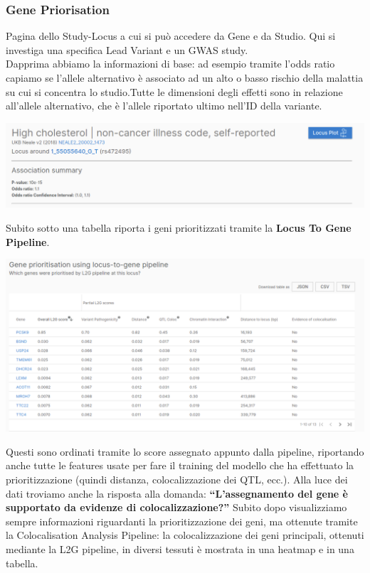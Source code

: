 \documentclass{article}
\begin{document}
\subsubsection{Gene Priorisation}
Pagina dello Study-Locus a cui si può accedere da Gene e da Studio. Qui si investiga una specifica Lead Variant e un GWAS study.\\
Dapprima abbiamo la informazioni di base:  ad esempio tramite l’odds ratio capiamo se l’allele alternativo è associato ad un alto o basso rischio della malattia su cui si concentra lo studio.Tutte le dimensioni degli effetti sono in relazione all’allele alternativo, che è l’allele riportato ultimo nell’ID della variante.
\begin{center}
    \includegraphics[width=1\textwidth]{figures/StudyLocus.png}
\end{center}
Subito sotto una tabella riporta i geni prioritizzati tramite la \textbf{Locus To Gene Pipeline}.
\begin{center}
    \includegraphics[width=1\textwidth]{figures/StudyLocus2.png}
\end{center}
Questi sono ordinati tramite lo score assegnato appunto dalla pipeline, riportando anche tutte le features usate per fare il training del modello che ha effettuato la prioritizzazione (quindi distanza, colocalizzazione dei QTL, ecc.). Alla luce dei dati troviamo anche la risposta alla domanda: \textbf{“L’assegnamento del gene è supportato da evidenze di colocalizzazione?”}
Subito dopo visualizziamo sempre informazioni riguardanti la prioritizzazione dei geni, ma ottenute tramite la Colocalisation Analysis Pipeline: la colocalizzazione dei geni principali, ottenuti mediante la L2G pipeline, in diversi tessuti è mostrata in una heatmap e in una tabella.
\end{document}
